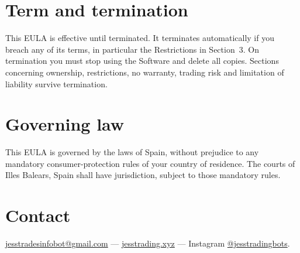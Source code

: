 \documentclass[11pt,a4paper]{article}
\begin{document}
\section{Term and termination}
This EULA is effective until terminated. It terminates automatically if you breach any of its terms,
in particular the Restrictions in Section~3. On termination you must stop using the Software and
delete all copies. Sections concerning ownership, restrictions, no warranty, trading risk and
limitation of liability survive termination.

\section{Governing law}
This EULA is governed by the laws of Spain, without prejudice to any mandatory consumer-protection
rules of your country of residence. The courts of Illes Balears, Spain shall have jurisdiction,
subject to those mandatory rules.

\section{Contact}
\href{mailto:jesstradesinfobot@gmail.com}{jesstradesinfobot@gmail.com} ---
\href{https://jesstrading.xyz}{jesstrading.xyz} --- Instagram
\href{https://www.instagram.com/jesstradingbots/}{@jesstradingbots}.
\end{document}
